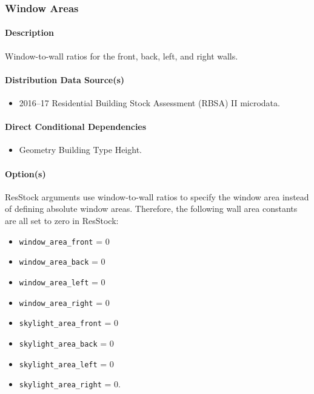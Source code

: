 \subsubsection{Window Areas}\label{window_areas}
\paragraph{Description}
Window-to-wall ratios for the front, back, left, and right walls.
\paragraph{Distribution Data Source(s)}
\begin{itemize}
 
\item
  2016--17 Residential Building Stock Assessment (RBSA) II microdata.
\end{itemize}
\paragraph{Direct Conditional Dependencies}
 
\begin{itemize}
    \item Geometry Building Type Height.
\end{itemize}
\paragraph{Option(s)}
ResStock arguments use window-to-wall ratios to specify the window area instead of defining absolute window areas. Therefore, the following wall area constants are all set to zero in ResStock:
\begin{itemize}
    \item  \texttt{window\_area\_front} = 0
    \item \texttt{window\_area\_back} = 0 
    \item \texttt{window\_area\_left} = 0
    \item \texttt{window\_area\_right} = 0
    \item \texttt{skylight\_area\_front} = 0 
    \item \texttt{skylight\_area\_back} = 0
    \item \texttt{skylight\_area\_left} = 0
    \item \texttt{skylight\_area\_right} = 0.

\end{itemize}

